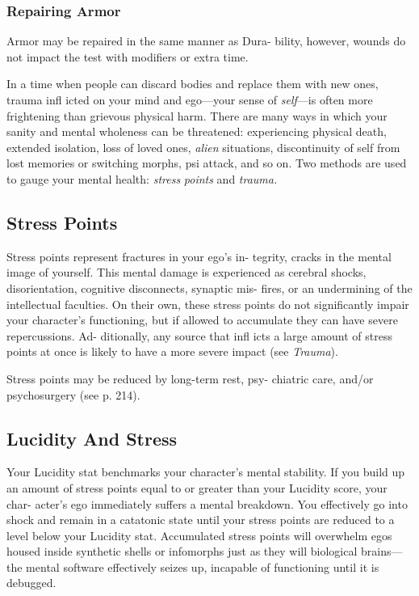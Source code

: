 \subsubsection{Repairing Armor}

Armor may be repaired in the same manner as Dura-
bility, however, wounds do not impact the test with 
modifiers or extra time.

In a time when people can discard bodies and 
replace them with new ones, trauma infl icted  on 
your mind and ego—your sense of \textit{self}—is often 
more frightening than grievous physical harm. There 
are many ways in which your sanity and mental 
wholeness can be threatened: experiencing physical 
death, extended isolation, loss of loved ones, \textit{alien}
situations, discontinuity of self from lost memories 
or switching morphs, psi attack, and so on. Two 
methods are used to gauge your mental health: \textit{stress }
\textit{points} and \textit{trauma.}

\subsection{Stress Points}

Stress points represent fractures in your ego's in-
tegrity, cracks in the mental image of yourself. This 
mental damage is experienced as cerebral shocks, 
disorientation, cognitive disconnects, synaptic mis-
fires, or an undermining of the intellectual faculties. 
On their own, these stress points do not significantly 
impair your character's functioning, but if allowed to 
accumulate they can have severe repercussions. Ad-
ditionally, any source that infl icts a large amount of 
stress points at once is likely to have a more severe 
impact (see \textit{Trauma}).

Stress points may be reduced by long-term rest, psy-
chiatric care, and/or psychosurgery (see p. 214).

\subsection{Lucidity And Stress}

Your Lucidity stat benchmarks your character's mental 
stability. If you build up an amount of stress points 
equal to or greater than your Lucidity score, your char-
acter's ego immediately suffers a mental breakdown. 
You effectively go into shock and remain in a catatonic 
state until your stress points are reduced to a level 
below your Lucidity stat. Accumulated stress points 
will overwhelm egos housed inside synthetic shells or 
infomorphs just as they will biological brains—the 
mental software effectively seizes up, incapable of 
functioning until it is debugged.

